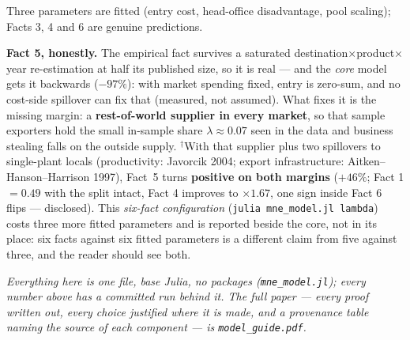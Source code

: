 \documentclass[10pt]{article}
\theoremstyle{plain}
\begin{document}
\noindent Three parameters are fitted (entry cost, head-office disadvantage, pool
scaling); Facts 3, 4 and 6 are genuine predictions.

\noindent\textbf{Fact 5, honestly.} The empirical fact survives a saturated
destination$\times$product$\times$year re-estimation at half its published size, so it
is real --- and the \emph{core} model gets it backwards ($-97\%$): with market
spending fixed, entry is zero-sum, and no cost-side spillover can fix that (measured,
not assumed). What fixes it is the missing margin: a \textbf{rest-of-world supplier in
every market}, so that sample exporters hold the small in-sample share
$\lambda\approx0.07$ seen in the data and business stealing falls on the outside
supply. $^{\dagger}$With that supplier plus two spillovers to single-plant locals
(productivity: Javorcik 2004; export infrastructure: Aitken--Hanson--Harrison 1997),
Fact~5 turns \textbf{positive on both margins} ($+46\%$; Fact 1 $=0.49$ with the split
intact, Fact 4 improves to $\times1.67$, one sign inside Fact 6 flips --- disclosed).
This \emph{six-fact configuration} (\texttt{julia mne\_model.jl lambda}) costs three
more fitted parameters and is reported beside the core, not in its place: six facts
against six fitted parameters is a different claim from five against three, and the
reader should see both.

\bigskip
\noindent\emph{Everything here is one file, base Julia, no packages
(\texttt{mne\_model.jl}); every number above has a committed run behind it. The full
paper --- every proof written out, every choice justified where it is made, and a
provenance table naming the source of each component --- is \texttt{model\_guide.pdf}.}
\end{document}
